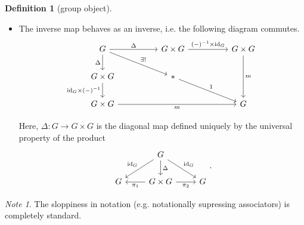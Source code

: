 \documentclass[a4paper]{report}
\theoremstyle{definition}
\newtheorem{definition}{Definition}[section]
\theoremstyle{plain}
\theoremstyle{remark}
\newtheorem{note}{Note}[section]
\begin{document}
\begin{definition}[group object]
\begin{itemize}
    \item The inverse map behaves as an inverse, i.e. the following diagram commutes.
      \begin{equation*}
        \begin{tikzcd}[column sep=huge]
          G 
          \arrow[r, "\Delta"]
          \arrow[d, swap, "\Delta"]
          \arrow[dr, "\exists!"]
          & G \times G 
          \arrow[r, "(-)^{-1} \times \mathrm{id}_{G}"]
          & G \times G
          \arrow[dd, "m"]
          \\
          G \times G
          \arrow[d, swap, "\mathrm{id}_{G} \times (-)^{-1}"]
          & *
          \arrow[dr, "1"]
          \\
          G \times G
          \arrow[rr, swap, "m"]
          & & G
        \end{tikzcd}
      \end{equation*}

      Here, $\Delta\colon G \to G \times G$ is the diagonal map defined uniquely by the universal property of the product
      \begin{equation*}
        \begin{tikzcd}
          & G
          \arrow[dr, "\mathrm{id}_{G}"]
          \arrow[dl, swap, "\mathrm{id}_{G}"]
          \arrow[d, "\Delta"]
          \\
          G 
          & G \times G
          \arrow[l, "\pi_{1}"]
          \arrow[r, swap, "\pi_{2}"]
          & G
        \end{tikzcd}.
      \end{equation*}
  \end{itemize}
\end{definition} 

\begin{note}
  The sloppiness in notation (e.g. notationally supressing associators) is completely standard.
\end{note}
\end{document}
